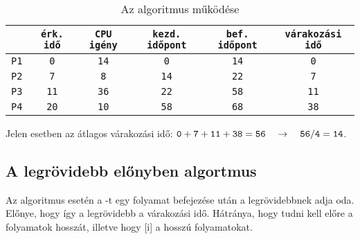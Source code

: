 \documentclass[../main.tex]{subfiles}
\begin{document}
\begin{table}[H]
	\centering
	\begin{tabular}{|c|c|c|c|c|c|}
		\hline
		            & \texttt{érk. idő} & \texttt{CPU igény} & \texttt{kezd. időpont} & \texttt{bef. időpont} & \texttt{várakozási idő}
		\\ \hline
		\texttt{P1} & \texttt{0}        & \texttt{14}        & \texttt{0}             & \texttt{14}           & \texttt{0}              \\
		\texttt{P2} & \texttt{7}        & \texttt{8}         & \texttt{14}            & \texttt{22}           & \texttt{7}              \\
		\texttt{P3} & \texttt{11}       & \texttt{36}        & \texttt{22}            & \texttt{58}           & \texttt{11}             \\
		\texttt{P4} & \texttt{20}       & \texttt{10}        & \texttt{58}            & \texttt{68}           & \texttt{38}             \\
		\hline
	\end{tabular}
	\caption{Az  algoritmus működése}
	\label{table:fcfs}
\end{table}

Jelen esetben az átlagos várakozási idő:
$\mathtt{0 + 7 + 11 + 38 = 56}
	\hspace*{1em}\rightarrow\hspace*{1em}
	\mathtt{56/4 = 14}$.

\subsection{A legrövidebb előnyben algortmus}

Az  algoritmus esetén a -t egy folyamat befejezése után a
legrövidebbnek adja oda. Előnye, hogy így a legrövidebb a várakozási idő.
Hátránya, hogy tudni kell előre a folyamatok hosszát, illetve hogy
[i] a hosszú folyamatokat.
\end{document}
